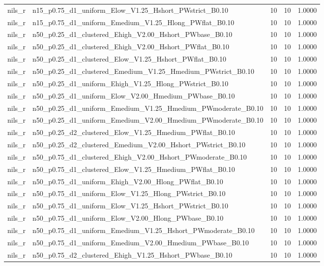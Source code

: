 \begin{tabular}{llrrr}
nils_r & n15_p0.75_d1_uniform_Elow_V1.25_Hshort_PWstrict_B0.10 & 10 & 10 & 1.0000 \\
nils_r & n15_p0.75_d1_uniform_Emedium_V1.25_Hlong_PWflat_B0.10 & 10 & 10 & 1.0000 \\
nils_r & n50_p0.25_d1_clustered_Ehigh_V2.00_Hshort_PWbase_B0.10 & 10 & 10 & 1.0000 \\
nils_r & n50_p0.25_d1_clustered_Ehigh_V2.00_Hshort_PWflat_B0.10 & 10 & 10 & 1.0000 \\
nils_r & n50_p0.25_d1_clustered_Elow_V1.25_Hshort_PWflat_B0.10 & 10 & 10 & 1.0000 \\
nils_r & n50_p0.25_d1_clustered_Emedium_V1.25_Hmedium_PWstrict_B0.10 & 10 & 10 & 1.0000 \\
nils_r & n50_p0.25_d1_uniform_Ehigh_V1.25_Hlong_PWstrict_B0.10 & 10 & 10 & 1.0000 \\
nils_r & n50_p0.25_d1_uniform_Elow_V2.00_Hmedium_PWbase_B0.10 & 10 & 10 & 1.0000 \\
nils_r & n50_p0.25_d1_uniform_Emedium_V1.25_Hmedium_PWmoderate_B0.10 & 10 & 10 & 1.0000 \\
nils_r & n50_p0.25_d1_uniform_Emedium_V2.00_Hmedium_PWmoderate_B0.10 & 10 & 10 & 1.0000 \\
nils_r & n50_p0.25_d2_clustered_Elow_V1.25_Hmedium_PWflat_B0.10 & 10 & 10 & 1.0000 \\
nils_r & n50_p0.25_d2_clustered_Emedium_V2.00_Hshort_PWstrict_B0.10 & 10 & 10 & 1.0000 \\
nils_r & n50_p0.75_d1_clustered_Ehigh_V2.00_Hshort_PWmoderate_B0.10 & 10 & 10 & 1.0000 \\
nils_r & n50_p0.75_d1_clustered_Elow_V1.25_Hmedium_PWflat_B0.10 & 10 & 10 & 1.0000 \\
nils_r & n50_p0.75_d1_uniform_Ehigh_V2.00_Hlong_PWflat_B0.10 & 10 & 10 & 1.0000 \\
nils_r & n50_p0.75_d1_uniform_Elow_V1.25_Hlong_PWstrict_B0.10 & 10 & 10 & 1.0000 \\
nils_r & n50_p0.75_d1_uniform_Elow_V1.25_Hshort_PWstrict_B0.10 & 10 & 10 & 1.0000 \\
nils_r & n50_p0.75_d1_uniform_Elow_V2.00_Hlong_PWbase_B0.10 & 10 & 10 & 1.0000 \\
nils_r & n50_p0.75_d1_uniform_Emedium_V1.25_Hshort_PWmoderate_B0.10 & 10 & 10 & 1.0000 \\
nils_r & n50_p0.75_d1_uniform_Emedium_V2.00_Hmedium_PWbase_B0.10 & 10 & 10 & 1.0000 \\
nils_r & n50_p0.75_d2_clustered_Ehigh_V1.25_Hshort_PWbase_B0.10 & 10 & 10 & 1.0000 \\

\end{tabular}
